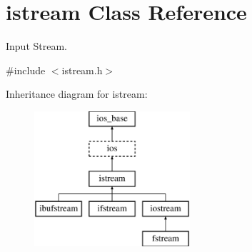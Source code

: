 \hypertarget{classistream}{}\section{istream Class Reference}
\label{classistream}


Input Stream.  




{\ttfamily \#include $<$istream.\+h$>$}

Inheritance diagram for istream\+:\begin{figure}[H]
\begin{center}
\leavevmode
\includegraphics[height=5.000000cm]{classistream}
\end{center}
\end{figure}
